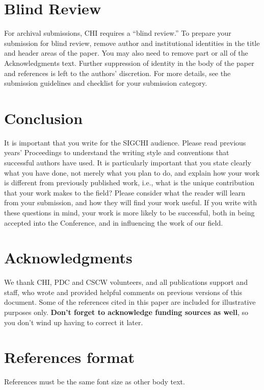 \documentclass{sigchi}
\begin{document}
\section{Blind Review}

For archival submissions, CHI requires a ``blind review.'' To prepare
your submission for blind review, remove author and institutional
identities in the title and header areas of the paper. You may also
need to remove part or all of the Acknowledgments text. Further
suppression of identity in the body of the paper and references is
left to the authors' discretion. For more details, see the submission
guidelines and checklist for your submission category.

\section{Conclusion}

It is important that you write for the SIGCHI audience. Please read
previous years' Proceedings to understand the writing style and
conventions that successful authors have used. It is particularly
important that you state clearly what you have done, not merely what
you plan to do, and explain how your work is different from previously
published work, i.e., what is the unique contribution that your work
makes to the field? Please consider what the reader will learn from
your submission, and how they will find your work useful. If you
write with these questions in mind, your work is more likely to be
successful, both in being accepted into the Conference, and in
influencing the work of our field.

\section{Acknowledgments}

We thank CHI, PDC and CSCW volunteers, and all publications support
and staff, who wrote and provided helpful comments on previous
versions of this document. Some of the references cited in this paper
are included for illustrative purposes only. \textbf{Don't forget
to acknowledge funding sources as well}, so you don't wind up
having to correct it later.

%
%
%
%
%
\balance

\section{References format}
References must be the same font size as other body text.



\end{document}
